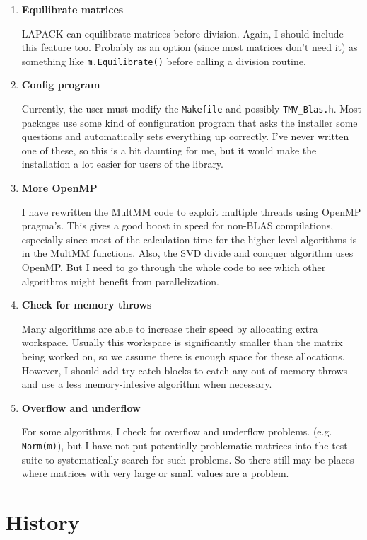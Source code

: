 \documentclass[twoside,letterpaper,11pt]{article}
\renewcommand{\tt}[1]{{\texttt {#1}}}
\begin{document}
\begin{enumerate}
\item
\textbf{Equilibrate matrices}

LAPACK can equilibrate matrices before division.  Again, I should include this
feature too.  Probably as an option (since most matrices don't need it)
as something like \tt{m.Equilibrate()} before calling a division routine.

\item
\textbf{Config program}

Currently, the user must modify the \tt{Makefile} and possibly 
\tt{TMV\_Blas.h}.  Most packages use some kind of configuration program
that asks the installer some questions and automatically sets everything
up correctly.  I've never written one of these, so this is a bit 
daunting for me, but it would make the 
installation a lot easier for users of the library.

\item
\textbf{More OpenMP}

I have rewritten the MultMM code to exploit multiple threads using 
OpenMP pragma's.  This gives a good boost in speed for non-BLAS 
compilations, especially since most of the calculation time for the higher-level
algorithms is in the MultMM functions.  Also, the SVD divide and conquer
algorithm uses OpenMP.  But I need to go through the whole code to
see which other algorithms might benefit from parallelization.

\item
\textbf{Check for memory throws}

Many algorithms are able to increase their speed by allocating extra
workspace.  Usually this workspace is significantly smaller than the
matrix being worked on, so we assume there is enough space for 
these allocations.  However, I should add try-catch blocks to catch 
any out-of-memory throws and use a less memory-intesive algorithm
when necessary.

\item
\textbf{Overflow and underflow}

For some algorithms, I check for overflow and underflow problems.
(e.g. \tt{Norm(m)}), but I have not put potentially problematic matrices
into the test suite to systematically search for such problems.  So there still
may be places where matrices with very large or small values are a problem.

\end{enumerate}

\newpage
\section{History}
\label{history}
\end{document}

